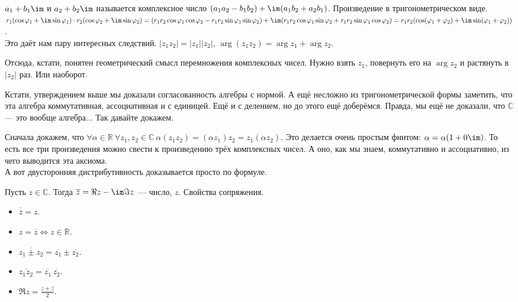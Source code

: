 \documentclass{article}
\begin{document}
\begin{itemize}
\begin{Comment}
        \end{Comment}
        \dfn {} $a_1+b_1\im$ и $a_2+b_2\im$ называется комплексное число $(a_1a_2-b_1b_2)+\im(a_1b_2+a_2b_1)$.
        \thm Произведение в тригонометрическом виде. $r_1(\cos\varphi_1+\im\sin\varphi_1)\cdot r_2(\cos\varphi_2+\im\sin\varphi_2)=(r_1r_2\cos\varphi_1\cos\varphi_2-r_1r_2\sin\varphi_1\sin\varphi_2)+\im(r_1r_2\cos\varphi_1\sin\varphi_2+r_1r_2\sin\varphi_1\cos\varphi_2)=r_1r_2(\cos(\varphi_1+\varphi_2)+\im\sin(\varphi_1+\varphi_2))$.\\
        Это даёт нам пару интересных следствий. $|z_1z_2|=|z_1||z_2|$, $\arg(z_1z_2)=\arg z_1+\arg z_2$.
        \begin{Comment}
            Отсюда, кстати, понятен геометрический смысл перемножения комплексных чисел. Нужно взять $z_1$, повернуть его на $\arg z_2$ и растянуть в $|z_2|$ раз. Или наоборот.
        \end{Comment}
        \thm Кстати, утверждением выше мы доказали согласованность алгебры с нормой. А ещё несложно из тригонометрической формы заметить, что эта алгебра коммутативная, ассоциативная и с единицей. Ещё и с делением, но до этого ещё доберёмся. Правда, мы ещё не доказали, что $\mathbb C$ --- это вообще алгебра... Так давайте докажем.
        \begin{Proof}
            Сначала докажем, что $\forall\alpha\in\mathbb R~\forall z_1,z_2\in\mathbb C~\alpha(z_1z_2)=(\alpha z_1)z_2=z_1(\alpha z_2)$. Это делается очень простым финтом: $\alpha=\alpha(1+0\im)$. То есть все три произведения можно свести к произведению трёх комплексных чисел. А оно, как мы знаем, коммутативно и ассоциативно, из чего выводится эта аксиома.\\
            А вот двусторонняя дистрибутивность доказывается просто по формуле.
        \end{Proof}
        \dfn Пусть $z\in\mathbb C$. Тогда $\overline z=\Re z-\im\Im z$ --- число,  $z$.
        \thm Свойства сопряжения.
        \begin{itemize}
            \item $\overline{\overline z}=z$.
            \item $z=\overline z\Leftrightarrow z\in\mathbb R$.
            \item $\overline{z_1\pm z_2}=\overline{z_1}\pm \overline{z_2}$.
            \item $\overline{z_1z_2}=\overline{z_1}\,\overline{z_2}$.
            \item $\Re z=\frac{z+\overline z}2$.

\end{itemize}
\end{itemize}
\end{document}
